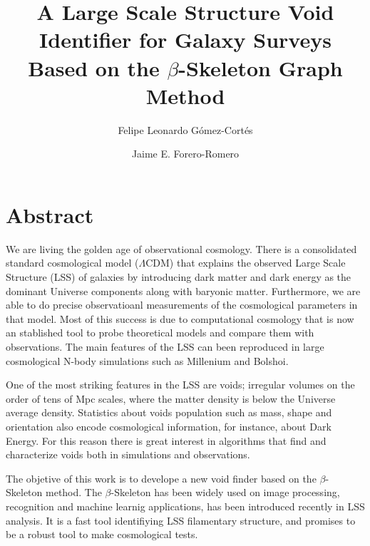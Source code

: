 \documentclass[manuscript]{aastex62}
\begin{document}
\title{A Large Scale Structure Void Identifier for Galaxy Surveys
  Based on the $\beta$-Skeleton Graph Method}


\author{Felipe Leonardo G\'omez-Cort\'es}

\nocollaboration


\author{Jaime E. Forero-Romero}


\section*{Abstract}

  We are living the golden age of observational cosmology. 
  There is a consolidated standard cosmological model ($\Lambda$CDM) that explains the observed
  Large Scale Structure (LSS) of galaxies by introducing dark matter and
  dark energy as the dominant Universe components along with baryonic matter.
  Furthermore,  we are able to do precise observatioanl measurements of the 
  cosmological parameters in that model. 
  Most of this success is due to computational cosmology that is now 
  an stablished tool to probe theoretical models and compare them with observations.
  The main features of the LSS can been reproduced in large cosmological N-body simulations
  such as Millenium and Bolshoi. 
  
  One of the most striking features in the LSS are voids; irregular 
  volumes on the order of tens of Mpc scales, where the matter density is below the Universe
  average density. 
  Statistics about voids population such as
  mass, shape and orientation also encode cosmological information, for instance, about Dark Energy.
  For this reason there is great interest in algorithms that find and characterize voids
  both in simulations and observations.

  The objetive of this work is to develope a new void finder  based
  on the $\beta$-Skeleton method.
  The $\beta$-Skeleton has been widely used on image processing,
  recognition and machine learnig applications, has been introduced
  recently in LSS analysis. It is a fast tool identifiying LSS filamentary structure,
  and promises to be a robust tool to make cosmological tests.
  
\end{document}
